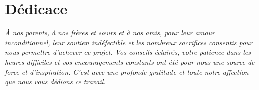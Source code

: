 \chapter*{Dédicace}
{}
\thispagestyle{empty}
\begingroup
\begin{flushright}
\it \LARGE À nos parents, à nos frères et sœurs et à nos amis, pour leur amour inconditionnel, leur soutien indéfectible et les nombreux sacrifices consentis pour nous permettre d'achever ce projet. Vos conseils éclairés, votre patience dans les heures difficiles et vos encouragements constants ont été pour nous une source de force et d'inspiration. C'est avec une profonde gratitude et toute notre affection que nous vous dédions ce travail.\\
\vspace{4mm}

\end{flushright}  
\endgroup
      